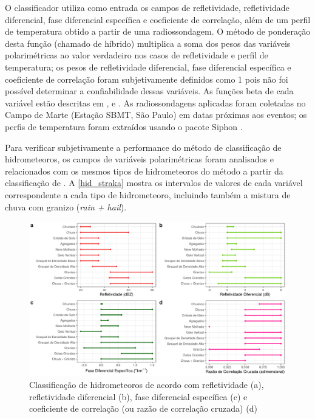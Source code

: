 O classificador utiliza como entrada os campos de refletividade, refletividade diferencial, fase diferencial específica e coeficiente de correlação, além de um perfil de temperatura obtido a partir de uma radiossondagem. O método de ponderação desta função (chamado de híbrido) multiplica a soma dos pesos das variáveis polarimétricas ao valor verdadeiro nos casos de refletividade e perfil de temperatura; os pesos de refletividade diferencial, fase diferencial específica e coeficiente de correlação foram subjetivamente definidos como 1 pois não foi possível determinar a confiabilidade dessas variáveis. As funções beta de cada variável estão descritas em ,  e . As radiossondagens aplicadas foram coletadas no Campo de Marte (Estação SBMT, São Paulo) em datas próximas aos eventos; os perfis de temperatura foram extraídos usando o pacote Siphon \cite{siphon}.

Para verificar subjetivamente a performance do método de classificação de hidrometeoros, os campos de variáveis polarimétricas foram analisados e relacionados com os mesmos tipos de hidrometeoros do método a partir da classificação de . A \autoref{hid_straka} mostra os intervalos de valores de cada variável correspondente a cada tipo de hidrometeoro, incluindo também a mistura de chuva com granizo (\textit{rain + hail}).

\begin{figure}[htb]
	\begin{center}
		\caption{Classificação de hidrometeoros de acordo com refletividade (a), refletividade diferencial (b), fase diferencial específica (c) e coeficiente de correlação (ou razão de correlação cruzada) (d)} 
		\label{hid_straka}
		\includegraphics[width=\columnwidth]{../General_Processing/figures/hids_strakaetal_ptbr.png}
	\end{center}
\end{figure}

